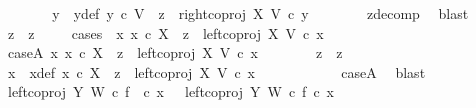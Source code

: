 \begin{isabellebody}
\ \ \ \ \isamarkupfalse%
\ \isamarkupfalse%
\ y{}\ \ y{}{\isacharunderscore}{\kern0pt}def{\isacharcolon}{\kern0pt}\ {\isachardoublequoteopen}y{}\ {\isasymin}\isactrlsub c\ V\ {\isasymand}\ z{}\ {\isacharequal}{\kern0pt}\ right{\isacharunderscore}{\kern0pt}coproj\ X\ V\ {\isasymcirc}\isactrlsub c\ y{}{\isachardoublequoteclose}\isanewline
\ \ \ \ \ \ \isamarkupfalse%
\ z{}{\isacharunderscore}{\kern0pt}decomp\ \isamarkupfalse%
\ blast\isanewline
\ \ \ \ \isamarkupfalse%
\ {\isachardoublequoteopen}z{}\ {\isacharequal}{\kern0pt}\ z{}{\isachardoublequoteclose}\isanewline
\ \ \ \ \isamarkupfalse%
{\isacharparenleft}{\kern0pt}cases\ {\isachardoublequoteopen}{\isasymexists}\ x{}{\isachardot}{\kern0pt}\ x{}\ {\isasymin}\isactrlsub c\ X\ {\isasymand}\ z{}\ {\isacharequal}{\kern0pt}\ left{\isacharunderscore}{\kern0pt}coproj\ X\ V\ {\isasymcirc}\isactrlsub c\ x{}{\isachardoublequoteclose}{\isacharparenright}{\kern0pt}\isanewline
\ \ \ \ \ \ \isamarkupfalse%
\ caseA{\isacharcolon}{\kern0pt}\ {\isachardoublequoteopen}{\isasymexists}x{}{\isachardot}{\kern0pt}\ x{}\ {\isasymin}\isactrlsub c\ X\ {\isasymand}\ z{}\ {\isacharequal}{\kern0pt}\ left{\isacharunderscore}{\kern0pt}coproj\ X\ V\ {\isasymcirc}\isactrlsub c\ x{}{\isachardoublequoteclose}\isanewline
\ \ \ \ \ \ \isamarkupfalse%
\ {\isachardoublequoteopen}z{}\ {\isacharequal}{\kern0pt}\ z{}{\isachardoublequoteclose}\isanewline
\ \ \ \ \ \ \isamarkupfalse%
\ {\isacharminus}{\kern0pt}\ \isanewline
\ \ \ \ \ \ \ \ \isamarkupfalse%
\ x{}\ \ x{}{\isacharunderscore}{\kern0pt}def{\isacharcolon}{\kern0pt}\ {\isachardoublequoteopen}x{}\ {\isasymin}\isactrlsub c\ X\ {\isasymand}\ z{}\ {\isacharequal}{\kern0pt}\ left{\isacharunderscore}{\kern0pt}coproj\ X\ V\ {\isasymcirc}\isactrlsub c\ x{}{\isachardoublequoteclose}\isanewline
\ \ \ \ \ \ \ \ \ \ \isamarkupfalse%
\ caseA\ \isamarkupfalse%
\ blast\isanewline
\ \ \ \ \ \ \ \ \isamarkupfalse%
\ {\isachardoublequoteopen}left{\isacharunderscore}{\kern0pt}coproj\ Y\ W\ {\isasymcirc}\isactrlsub c\ f\ \ {\isasymcirc}\isactrlsub c\ x{}\ \ {\isacharequal}{\kern0pt}\ {\isacharparenleft}{\kern0pt}left{\isacharunderscore}{\kern0pt}coproj\ Y\ W\ {\isasymcirc}\isactrlsub c\ f{\isacharparenright}{\kern0pt}\ {\isasymcirc}\isactrlsub c\ x{}{\isachardoublequoteclose}\isanewline

\end{isabellebody}
